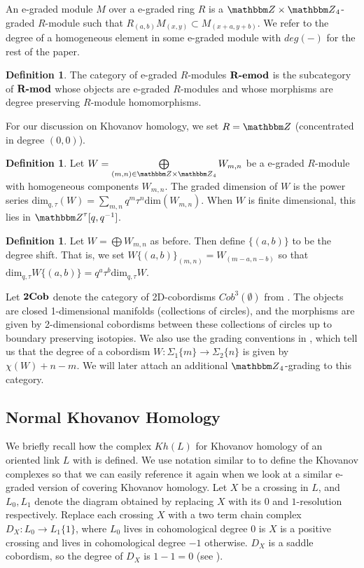 \documentclass{amsart}
\theoremstyle{plain}
\theoremstyle{definition}
\newtheorem{definition}[theorem]{Definition}
\theoremstyle{definition}
\numberwithin{equation}{section}
\numberwithin{theorem}{section}
\newcommand{\cat}[1]{\ensuremath{\mbox{\bfseries {\upshape {#1}}}}}
\renewcommand{\to}{\rightarrow}
\numberwithin{equation}{section}
\def\Z{{\mathbbm Z}}
\begin{document}
An e-graded module $M$ over a e-graded ring $R$ is a $\Z\times \Z_4$-graded $R$-module such that $R_{(a,b)}M_{(x,y)}\subset M_{(x+a,y+b)}$.
We refer to the degree of a homogeneous element in some e-graded module with $deg(-)$ for the rest of the paper.
%
\begin{definition}
  The category of e-graded $R$-modules $\cat{R-emod}$ is the subcategory of $\cat{R-mod}$ whose objects are e-graded $R$-modules and whose morphisms are degree preserving $R$-module homomorphisms.
\end{definition}
%
For our discussion on Khovanov homology, we set $R=\Z$ (concentrated in degree $(0,0)$).
%
\begin{definition}
  Let $W=\bigoplus\limits_{(m,n)\in \Z \times \Z_4} W_{m,n}$ be a e-graded $R$-module with homogeneous components $W_{m,n}$. The graded dimension of $W$ is the power series $\text{dim}_{q,\tau}(W)=\sum_{m,n}q^m\tau^n \text{dim}(W_{m,n})$. When $W$ is finite dimensional, this lies in $\Z^\tau[q,q^{-1}]$.
\end{definition}
\begin{definition}
  Let $W= \bigoplus W_{m,n}$ as before. Then define $\{(a,b)\}$ to be the degree shift. That is, we set $W\{(a,b)\}_{(m,n)}=W_{(m-a,n-b)}$ so that $\text{dim}_{q,\tau}W\{(a,b)\}=q^{a}\tau^b \text{dim}_{q,\tau} W$.
\end{definition}


Let $\cat{2Cob}$ denote the category of 2D-cobordisms $Cob^3(\emptyset)$ from \cite{BN2}.
The objects are closed 1-dimensional manifolds (collections of circles), and the morphisms are given by 2-dimensional cobordisms between these collections of circles up to boundary preserving isotopies.
We also use the grading conventions in \cite[Section 6]{BN2}, which tell us that the degree of a cobordism $W: \Sigma_1\{m\}\to \Sigma_2\{n\}$ is given by $\chi(W)+n-m$.
We will later attach an additional $\Z_4$-grading to this category.



\subsection{Normal Khovanov Homology}
We briefly recall how the complex $Kh(L)$ for Khovanov homology of an oriented link $L$ with is defined.
We use notation similar to \cite{BN2, P} to define the Khovanov complexes so that we can easily reference it again when we look at a similar e-graded version of covering Khovanov homology.
Let $X$ be a crossing in $L$, and $L_0, L_1$ denote the diagram obtained by replacing $X$ with its $0$ and $1$-resolution respectively.
Replace each crossing $X$ with a two term chain complex $D_X: L_0 \to L_1\{1\}$, where $L_0$ lives in cohomological degree $0$ is $X$ is a positive crossing and lives in cohomological degree $-1$ otherwise.
$D_X$ is a saddle cobordism, so the degree of $D_X$ is $1-1=0$ (see \cite[Section 6]{BN2}).
\end{document}
